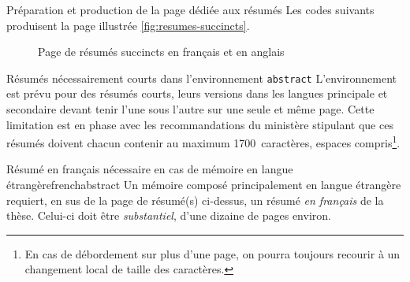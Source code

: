 \begin{dbexample}{Préparation et production de la page dédiée aux résumés}{}
  Les codes suivants produisent la page illustrée \vref{fig:resumes-succincts}.
\begin{bodycode}
\begin{abstract}
  \lipsum[1-2]
\end{abstract}
\begin{abstract}
  \lipsum[3-4]
\end{abstract}
\end{bodycode}
\end{dbexample}

\begin{figure}[htbp]
  \centering {}%
  \caption{Page de résumés succincts en français et en anglais}
  \label{fig:resumes-succincts}
\end{figure}

\begin{dbwarning}{Résumés nécessairement courts dans l'environnement
    \protect\lstinline+abstract+}{}
  L'environnement  est prévu pour des résumés courts, leurs
  versions dans les langues principale et secondaire devant tenir l'une sous
  l'autre sur une seule et même page. Cette limitation est en phase avec les
  recommandations du ministère stipulant que ces résumés doivent chacun
  contenir au maximum 1700~caractères, espaces compris\footnote{En cas de
    débordement sur plus d'une page, on pourra toujours recourir à un
    changement local de taille des caractères.}.
\end{dbwarning}

\begin{dbwarning}{Résumé en français nécessaire en cas de mémoire en langue
    étrangère}{frenchabstract}
  Un mémoire composé principalement en langue étrangère  requiert, en sus de la page de
  résumé(s) ci-dessus, un résumé \emph{en français} de la thèse. Celui-ci doit
  être \emph{substantiel}, d'une dizaine de pages environ.
\end{dbwarning}

